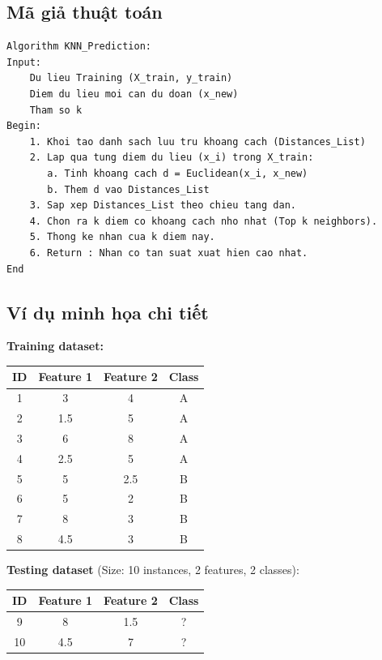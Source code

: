 \subsection{Mã giả thuật toán}
\begin{lstlisting}[caption={Mã giả thuật toán KNN}]
Algorithm KNN_Prediction:
Input:
    Du lieu Training (X_train, y_train)
    Diem du lieu moi can du doan (x_new)
    Tham so k 
Begin:
    1. Khoi tao danh sach luu tru khoang cach (Distances_List)
    2. Lap qua tung diem du lieu (x_i) trong X_train:
       a. Tinh khoang cach d = Euclidean(x_i, x_new)
       b. Them d vao Distances_List
    3. Sap xep Distances_List theo chieu tang dan.
    4. Chon ra k diem co khoang cach nho nhat (Top k neighbors).
    5. Thong ke nhan cua k diem nay.
    6. Return : Nhan co tan suat xuat hien cao nhat.
End
\end{lstlisting}

\subsection{Ví dụ minh họa chi tiết}
\textbf{Training dataset:}
\begin{table}[H]
    \centering
    \begin{tabular}{|c|c|c|c|}
        \hline
        \textbf{ID} & \textbf{Feature 1} & \textbf{Feature 2} & \textbf{Class} \\
        \hline
        1 & 3 & 4 & A \\ \hline
        2 & 1.5 & 5 & A \\ \hline
        3 & 6 & 8 & A \\ \hline
        4 & 2.5 & 5 & A \\ \hline
        5 & 5 & 2.5 & B \\ \hline
        6 & 5 & 2 & B \\ \hline  
        7 & 8 & 3 & B \\ \hline
        8 & 4.5 & 3 & B \\ \hline
    \end{tabular}
\end{table}

\textbf{Testing dataset} (Size: 10 instances, 2 features, 2 classes):
\begin{table}[H]
    \centering
    \begin{tabular}{|c|c|c|c|}
        \hline
        \textbf{ID} & \textbf{Feature 1} & \textbf{Feature 2} & \textbf{Class} \\
        \hline
        9 & 8 & 1.5 & ? \\ \hline
        10 & 4.5 & 7 & ? \\ \hline
    \end{tabular}
\end{table}


